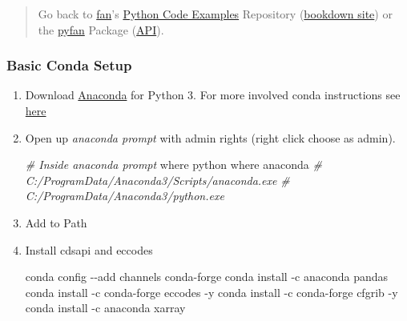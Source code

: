 \documentclass[
]{book}
\newenvironment{Shaded}{\begin{snugshade}}{\end{snugshade}}
\newcommand{\CommentTok}[1]{\textcolor[rgb]{0.56,0.35,0.01}{\textit{#1}}}
\newcommand{\ExtensionTok}[1]{#1}
\newcommand{\NormalTok}[1]{#1}
\begin{document}
\begin{quote}
Go back to \href{http://fanwangecon.github.io/}{fan}'s \href{https://fanwangecon.github.io/Py4Econ/}{Python Code Examples} Repository (\href{https://fanwangecon.github.io/Py4Econ/bookdown}{bookdown site}) or the \href{https://pyfan.readthedocs.io/en/latest/}{pyfan} Package (\href{https://pyfan.readthedocs.io/en/latest/reference.html}{API}).
\end{quote}

\hypertarget{basic-conda-setup}{%
\subsubsection{Basic Conda Setup}\label{basic-conda-setup}}

\begin{enumerate}
\def\labelenumi{\arabic{enumi}.}
\item
  Download \href{https://www.anaconda.com/products/individual}{Anaconda} for Python 3. For more involved conda instructions see \href{https://fanwangecon.github.io/Tex4Econ/nontex/install/windows/fn_installations.html}{here}
\item
  Open up \emph{anaconda prompt} with admin rights (right click choose as admin).

\begin{Shaded}
\begin{Highlighting}[]
\CommentTok{\# Inside anaconda prompt}
\ExtensionTok{where}\NormalTok{ python}
\ExtensionTok{where}\NormalTok{ anaconda}
\CommentTok{\# C:/ProgramData/Anaconda3/Scripts/anaconda.exe}
\CommentTok{\# C:/ProgramData/Anaconda3/python.exe}
\end{Highlighting}
\end{Shaded}
\item
  Add to Path
\item
  Install cdsapi and eccodes

\begin{Shaded}
\begin{Highlighting}[]
\ExtensionTok{conda}\NormalTok{ config {-}{-}add channels conda{-}forge}
\ExtensionTok{conda}\NormalTok{ install {-}c anaconda pandas}
\ExtensionTok{conda}\NormalTok{ install {-}c conda{-}forge eccodes {-}y}
\ExtensionTok{conda}\NormalTok{ install {-}c conda{-}forge cfgrib {-}y}
\ExtensionTok{conda}\NormalTok{ install {-}c anaconda xarray}
\end{Highlighting}
\end{Shaded}
\end{enumerate}
\end{document}
